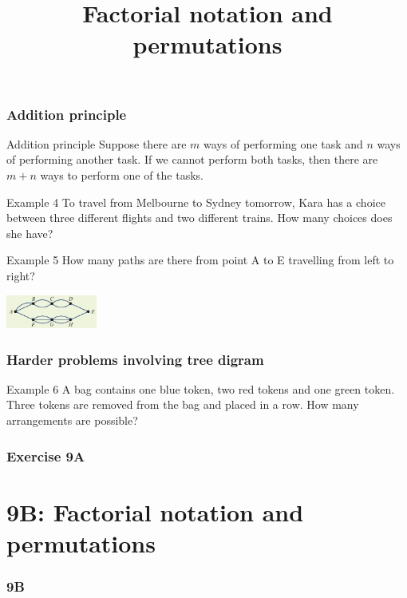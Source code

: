 \documentclass[
	11pt, %
]{beamer}
\begin{document}
\begin{frame}[t]
    \frametitle{Addition principle}
    \begin{block}{Addition principle}
        Suppose there are $m$ ways of performing one task and $n$ ways of performing another task. 
        If we cannot perform both tasks, then there are $m+n$ ways to perform one of the tasks.
    \end{block}
    \begin{block}{Example 4}
        To travel from Melbourne to Sydney tomorrow, Kara has a choice between three different flights 
        and two different trains. How many choices does she have?
    \end{block}
    \begin{block}{Example 5}
        How many paths are there from point A to E travelling from left to right?\\
        \begin{center}
            \includegraphics[width = 3cm]{Example5.png}
        \end{center}
    \end{block}
\end{frame}

\begin{frame}[t]
    \frametitle{Harder problems involving tree digram}
    \begin{block}{Example 6}
        A bag contains one blue token, two red tokens and one green token. Three tokens are removed from the bag and placed 
        in a row. How many arrangements are possible?
    \end{block}
\end{frame}

\begin{frame}
    \frametitle{Exercise 9A}
\end{frame}


\section{9B: Factorial notation and permutations}
\begin{frame}
    \frametitle{9B}
    \begin{center}
        \title{Factorial notation and permutations}
        \maketitle
    \end{center}
\end{frame}
\end{document}
